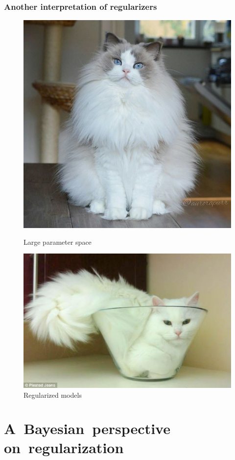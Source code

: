 \documentclass[usenames,dvipsnames,aspectratio=169]{beamer}
\begin{document}
\begin{frame}
\frametitle{Another interpretation of regularizers}

\begin{figure}
\centering
\begin{minipage}{.5\textwidth}
  \centering
  \includegraphics[width=0.6\columnwidth]{cat_source.png}
  \caption{\normalsize Large parameter space}
\end{minipage}%
\begin{minipage}{.5\textwidth}
  \centering
  \includegraphics[width=0.85\columnwidth]{cat_regularized.png}
  \caption{\normalsize Regularized models}
\end{minipage}
\end{figure}

\end{frame}



\section{A~Bayesian~perspective on~regularization}
\end{document}

